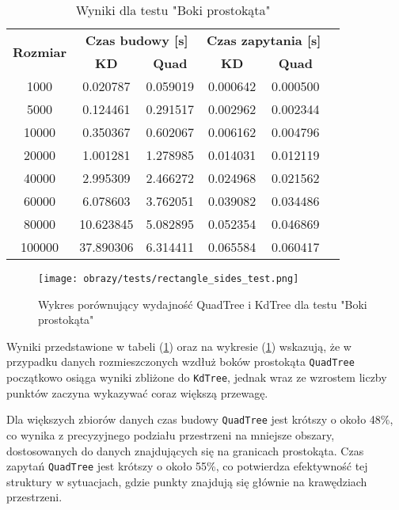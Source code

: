 \documentclass[12pt]{article}
\begin{document}
\begin{table}[h]
\centering
\caption{Wyniki dla testu "Boki prostokąta"}
\label{tab:rectangle_sides}
\begin{tabular}{cccccc}
\toprule
\multirow{2}{*}{\textbf{Rozmiar}} & \multicolumn{2}{c}{\textbf{Czas budowy [s]}} & \multicolumn{2}{c}{\textbf{Czas zapytania [s]}} \\
\cmidrule(lr){2-3} \cmidrule(lr){4-5}
 & \textbf{KD} & \textbf{Quad} & \textbf{KD} & \textbf{Quad} \\
\midrule
1000   & 0.020787 & 0.059019 & 0.000642 & 0.000500 \\
5000   & 0.124461 & 0.291517 & 0.002962 & 0.002344 \\
10000  & 0.350367 & 0.602067 & 0.006162 & 0.004796 \\
20000  & 1.001281 & 1.278985 & 0.014031 & 0.012119 \\
40000  & 2.995309 & 2.466272 & 0.024968 & 0.021562 \\
60000  & 6.078603 & 3.762051 & 0.039082 & 0.034486 \\
80000  & 10.623845 & 5.082895 & 0.052354 & 0.046869 \\
100000 & 37.890306 & 6.314411 & 0.065584 & 0.060417 \\
\bottomrule
\end{tabular}
\end{table}
\begin{figure}[h]
    \centering
    \texttt{[image: obrazy/tests/rectangle\_sides\_test.png]}
    \caption{Wykres porównujący wydajność QuadTree i KdTree dla testu "Boki prostokąta"}
    \label{fig:rectangle_sides_tests}
\end{figure}

\newpage
\noindent Wyniki przedstawione w tabeli (\ref{tab:rectangle_sides}) oraz na wykresie (\ref{fig:rectangle_sides_tests}) wskazują, że w przypadku danych rozmieszczonych wzdłuż boków prostokąta \texttt{QuadTree} początkowo osiąga wyniki zbliżone do \texttt{KdTree}, jednak wraz ze wzrostem liczby punktów zaczyna wykazywać coraz większą przewagę.

\noindent Dla większych zbiorów danych czas budowy \texttt{QuadTree} jest krótszy o około 48\%, co wynika z precyzyjnego podziału przestrzeni na mniejsze obszary, dostosowanych do danych znajdujących się na granicach prostokąta. Czas zapytań \texttt{QuadTree} jest krótszy o około 55\%, co potwierdza efektywność tej struktury w sytuacjach, gdzie punkty znajdują się głównie na krawędziach przestrzeni.
\end{document}
